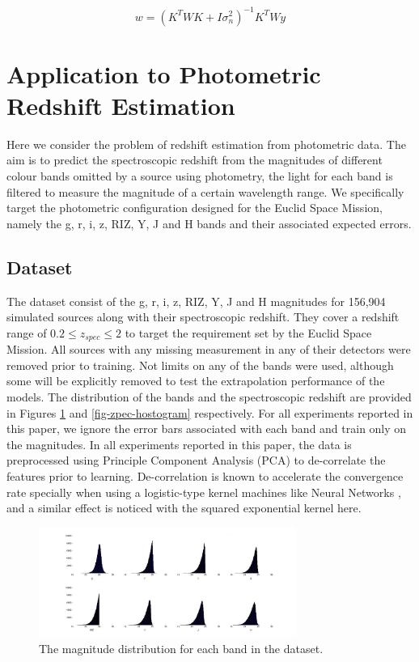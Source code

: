 \documentclass[useAMS,usenatbib,fleqn]{mn2e}
\begin{document}
\begin{equation}
\label{eq-weighted-linear-regression-objective-rectangular}
w = \left(K^{T}WK+I\sigma_{n}^{2} \right)^{-1}K^{T}Wy
\end{equation}

\section{Application to Photometric Redshift Estimation}
\label{sec-application}

Here we consider the problem of redshift estimation from photometric data. The aim is to predict the spectroscopic redshift from the magnitudes of different colour bands omitted by a source using photometry, the light for each band is filtered to measure the magnitude of a certain wavelength range. We specifically target the photometric configuration designed for the Euclid Space Mission, namely the g, r, i, z, RIZ, Y, J and H bands and their associated expected errors. 

\subsection{Dataset}
\label{sec-dataset}

The dataset consist of the g, r, i, z, RIZ, Y, J and H magnitudes for 156,904 simulated sources along with their spectroscopic redshift. They cover a redshift range of $0.2 \le z_{spec} \le 2$ to target the requirement set by the Euclid Space Mission. All sources with any missing measurement in any of their detectors were removed prior to training. Not limits on any of the bands were used, although some will be explicitly removed to test the extrapolation performance of the models. The distribution of the bands and the spectroscopic redshift are provided in Figures \ref{fig-bands-hostograms} and \ref{fig-zpec-hostogram} respectively. For all experiments reported in this paper, we ignore the error bars associated with each band and train only on the magnitudes. In all experiments reported in this paper, the data is preprocessed using Principle Component Analysis (PCA) \cite{} to de-correlate the features prior to learning. De-correlation is known to accelerate the convergence rate specially when using a logistic-type kernel machines like Neural Networks \cite{}, and a similar effect is noticed with the squared exponential kernel here.

\begin{figure}
       \centering
       \includegraphics[width=0.75\textwidth]{bands.jpg}
        \caption{The magnitude distribution for each band in the dataset.} 
       \label{fig-bands-hostograms}
\end{figure}
\end{document}

